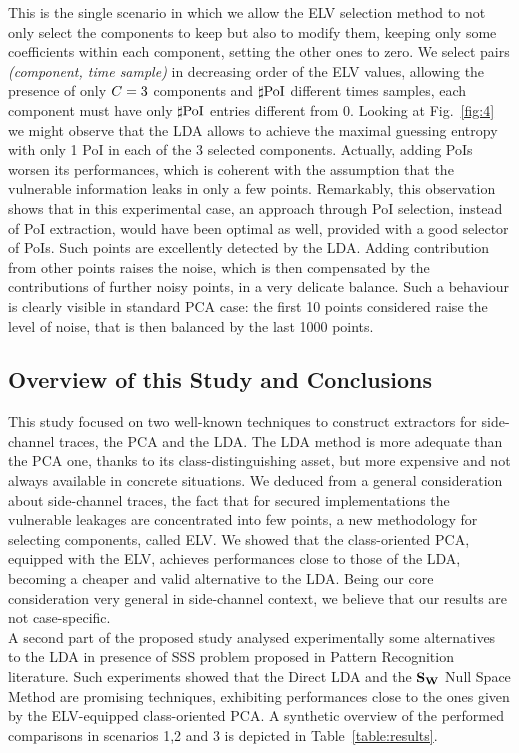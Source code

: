 This is the single scenario in which we allow the ELV selection method to not only select the components to keep but also to modify them, keeping only some coefficients within each component, setting the other ones to zero. We select pairs \textit{(component, time sample)} in decreasing order of the ELV values, allowing the presence of only $C = 3$ components and $\sharp\mathrm{PoI}$ different times samples, \ie each component must have only $\sharp\mathrm{PoI}$ entries different from 0.
Looking at Fig.~\ref{fig:4} we might observe that the LDA allows to achieve the maximal guessing entropy with only 1 PoI in each of the 3 selected components.  Actually, adding PoIs worsen its performances, which is coherent with the assumption that the vulnerable information leaks in only a few points. Remarkably, this observation shows that in this experimental case, an approach through PoI selection, instead of PoI extraction, would have been optimal as well, provided with a good selector of PoIs. Such points are excellently detected by the LDA. Adding contribution from other points raises the noise, which is then compensated by the contributions of further noisy points, in a very delicate balance. Such a behaviour is clearly visible in standard PCA case: the first 10 points considered raise the level of noise, that is then balanced by the last 1000 points.


\subsection{Overview of this Study and Conclusions}


This study focused on two well-known techniques to construct extractors for side-channel traces, the PCA and the LDA. The LDA method is more adequate than the PCA one, thanks to its class-distinguishing asset, but more expensive and not always available in concrete situations. We deduced from a general consideration about side-channel traces, \ie the fact that for secured implementations the vulnerable leakages are concentrated into few points, a new methodology  for selecting components, called ELV. We showed that the class-oriented PCA, equipped with the ELV, achieves performances close to those of the LDA, becoming a cheaper and valid alternative to the LDA. Being our core consideration very general in side-channel context, we believe that our results are not case-specific.  \\
A second part of the proposed study analysed experimentally some alternatives to the LDA in presence of SSS problem proposed in Pattern Recognition literature. Such experiments showed that the Direct LDA and the $\textbf{S}_{\textbf{W}}$ Null Space Method are promising techniques, exhibiting performances close to the ones given by the ELV-equipped class-oriented PCA. A synthetic overview of the performed comparisons in scenarios 1,2 and 3 is depicted in Table~\ref{table:results}.

